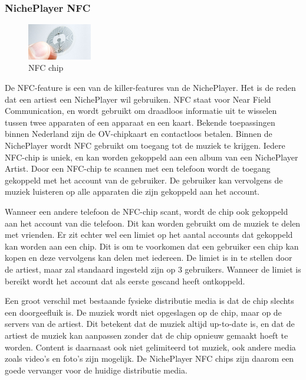 \subsubsection*{NichePlayer NFC}
\begin{figure}
  \centering
  \includegraphics[width=0.25\textwidth]{assets/uitvoering/NFC_chips.jpg}
  \caption{NFC chip}
  \label{fig:uitvoering:NFC_chip}
\end{figure}
De NFC-feature is een van de killer-features van de NichePlayer. Het is de reden dat een artiest een NichePlayer wil gebruiken. NFC staat voor Near Field Communication, en wordt gebruikt om draadloos informatie uit te wisselen tussen twee apparaten of een apparaat en een kaart. Bekende toepassingen binnen Nederland zijn de OV-chipkaart en contactloos betalen. Binnen de NichePlayer wordt NFC gebruikt om toegang tot de muziek te krijgen. Iedere NFC-chip is uniek, en kan worden gekoppeld aan een album van een NichePlayer Artist. Door een NFC-chip te scannen met een telefoon wordt de toegang gekoppeld met het account van de gebruiker. De gebruiker kan vervolgens de muziek luisteren op alle apparaten die zijn gekoppeld aan het account.

Wanneer een andere telefoon de NFC-chip scant, wordt de chip ook gekoppeld aan het account van die telefoon. Dit kan worden gebruikt om de muziek te delen met vrienden. Er zit echter wel een limiet op het aantal accounts dat gekoppeld kan worden aan een chip. Dit is om te voorkomen dat een gebruiker een chip kan kopen en deze vervolgens kan delen met iedereen. De limiet is in te stellen door de artiest, maar zal standaard ingesteld zijn op 3 gebruikers. Wanneer de limiet is bereikt wordt het account dat als eerste gescand heeft ontkoppeld.

Een groot verschil met bestaande fysieke distributie media is dat de chip slechts een doorgeefluik is. De muziek wordt niet opgeslagen op de chip, maar op de servers van de artiest. Dit betekent dat de muziek altijd up-to-date is, en dat de artiest de muziek kan aanpassen zonder dat de chip opnieuw gemaakt hoeft te worden. Content is daarnaast ook niet gelimiteerd tot muziek, ook andere media zoals video's en foto's zijn mogelijk. De NichePlayer NFC chips zijn daarom een goede vervanger voor de huidige distributie media.

